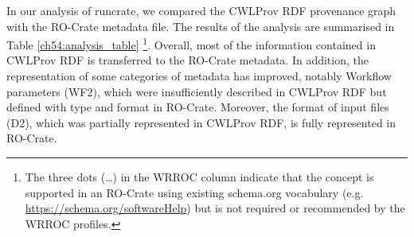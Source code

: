 In our analysis of runcrate, we compared the CWLProv RDF provenance graph with the RO-Crate metadata file. The results of the analysis are summarised in Table
\vref{ch54:analysis_table} \footnote{
  The three dots (…) in the WRROC column indicate that  the concept is supported in an RO-Crate using existing schema.org vocabulary (e.g. \url{https://schema.org/softwareHelp}) but is not required or recommended by the WRROC profiles.
}.
Overall, most of the information contained in CWLProv RDF is transferred to the RO-Crate metadata.
In addition, the representation of some categories of metadata has improved, notably Workflow parameters (WF2), which were insufficiently described in CWLProv RDF but defined with type and format in RO-Crate.
Moreover, the format of input files (D2), which was partially represented in CWLProv RDF, is fully represented in RO-Crate.

